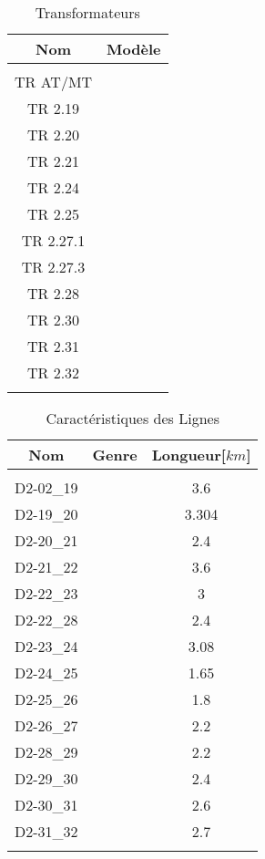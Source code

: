 \vspace{-.5cm}
\begin{table}[H]
	\captionsetup{justification=centering,margin=2cm}
	\caption{Transformateurs}
	\label{tab:Transformateurs}
	\centering
	\begin{tabular}{cc}
		\hline
		Nom&Modèle\\
		\hline\\
		TR AT/MT&\trafoi\\
		TR 2.19&\trafoiv\\
		TR 2.20&\trafoiii\\
		TR 2.21&\trafoiii\\
		TR 2.24&\trafoiii\\
		TR 2.25&\trafoiii\\
		TR 2.27.1&\trafoiv\\
		TR 2.27.3&\trafoiv\\
		TR 2.28&\trafoii\\
		TR 2.30&\trafoiv\\
		TR 2.31&\trafoiii\\
		TR 2.32&\trafoiii\\
		\hline\\
	\end{tabular}
\end{table}	
\vspace{-.5cm}
\begin{table}[H]
	\captionsetup{justification=centering,margin=2cm}
	\caption{Caractéristiques des Lignes}
	\label{tab:Caractéristiques_des_Lignes}
	\centering
	\begin{tabular}{ccc}
		\hline
		Nom&Genre&Longueur[$ km $]\\
		\hline\\
		D2-02\_19&\cablei&3.6\\
		D2-19\_20	&\cablei&3.304\\
		D2-20\_21	&\cableiii&2.4\\
		D2-21\_22	&\cableiii&3.6\\
		D2-22\_23	&\cableiii&3\\
		D2-22\_28	&\cableii&2.4\\
		D2-23\_24	&\cableiii&3.08\\
		D2-24\_25	&\cableiii&1.65\\
		D2-25\_26	&\cableiii&1.8\\
		D2-26\_27	&\cableiii&2.2\\
		D2-28\_29	&\cableii&2.2\\
		D2-29\_30	&\cableii&2.4\\
		D2-30\_31	&\cableii&2.6\\
		D2-31\_32	&\cableii&2.7\\
		\hline\\
	\end{tabular}
\end{table}
